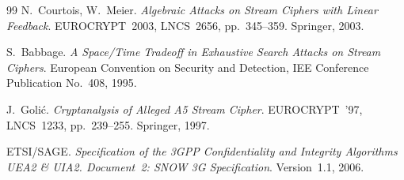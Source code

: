 \documentclass[11pt,a4paper]{article}
\begin{document}
\begin{thebibliography}{99}
N.~Courtois, W.~Meier. \emph{Algebraic Attacks on Stream Ciphers with Linear
Feedback}. EUROCRYPT~2003, LNCS~2656, pp.~345--359. Springer, 2003.

S.~Babbage. \emph{A Space/Time Tradeoff in Exhaustive Search Attacks on Stream
Ciphers}. European Convention on Security and Detection, IEE Conference
Publication No.~408, 1995.

J.~Goli\'c. \emph{Cryptanalysis of Alleged A5 Stream Cipher}. EUROCRYPT~'97,
LNCS~1233, pp.~239--255. Springer, 1997.

ETSI/SAGE. \emph{Specification of the 3GPP Confidentiality and Integrity
Algorithms UEA2 \& UIA2. Document~2: SNOW 3G Specification}. Version~1.1, 2006.

\end{thebibliography}
\end{document}
